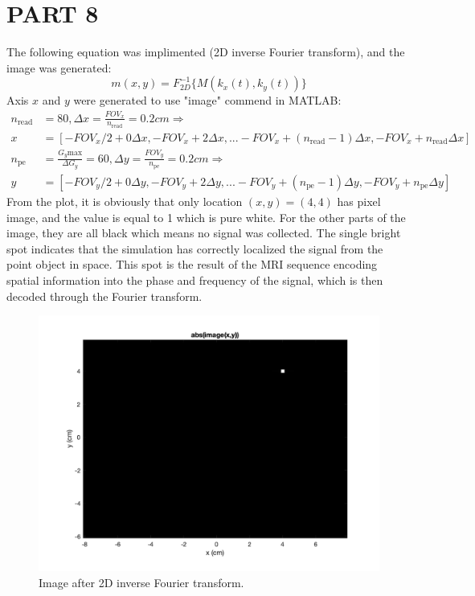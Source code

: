 \documentclass{report}
\begin{document}
\section[short]{PART 8}
The following equation was implimented (2D inverse Fourier transform), and the image was generated:
\[
m(x,y) = F^{-1}_{2D}\{M(k_x(t), k_y(t))\}
\]
Axis $x$ and $y$ were generated to use "image" commend in MATLAB:
\begin{align*}
n_{\text{read}} &= 80, \Delta x = \frac{FOV_x}{n_{\text{read}}} = 0.2cm \Rightarrow \\
x &= [-FOV_x/2 + 0 \Delta x, -FOV_x + 2 \Delta x, ... -FOV_x + (n_{\text{read}} - 1) \Delta x, -FOV_x + n_{\text{read}} \Delta x]\\
n_{\text{pe}} &= \frac{G_y{\text{max}}}{\Delta G_y} = 60, \Delta y = \frac{FOV_y}{n_{\text{pe}}} = 0.2cm \Rightarrow \\
y &= [-FOV_y/2 + 0 \Delta y, -FOV_y + 2 \Delta y, ... -FOV_y + (n_{\text{pe}} - 1) \Delta y, -FOV_y + n_{\text{pe}} \Delta y]
\end{align*}
From the plot, it is obviously that only location $(x,y) = (4,4)$ has pixel image,
 and the value is equal to 1 which is pure white. For the other parts of the image,
 they are all black which means no signal was collected. The single bright spot indicates that the
  simulation has correctly localized the signal from the point object in space. This spot is the 
  result of the MRI sequence encoding spatial information into the phase and frequency of the signal, 
  which is then decoded through the Fourier transform.

\begin{figure}[hb]
    \centering
    \includegraphics[width=1\textwidth]{8.png}
    \caption{Image after 2D inverse Fourier transform.}
\end{figure}
\newpage 
\end{document}
